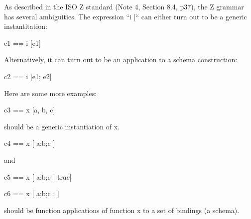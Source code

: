 As described in the ISO Z standard (Note 4, Section 8.4, p37), the Z
grammar has several ambiguities.  The expression ``i [``
can either turn out to be a generic instantitation:

\begin{zed}
  c1 == i [e1]
\end{zed}

Alternatively, it can turn out to be an application to a schema construction:

\begin{zed}
  c2 == i [e1; e2]
\end{zed}

Here are some more examples:

\begin{zed}
  c3 == x [a, b, c]
\end{zed}

should be a generic instantiation of x.

\begin{zed}
  c4 == x [ a;b;c ]
\end{zed}

and

\begin{zed}
  c5 == x [ a;b;c | true]
\end{zed}

\begin{zed}
  c6 == x [ a;b;c : \nat]
\end{zed}

should be function applications of function x to a set of bindings (a schema).

